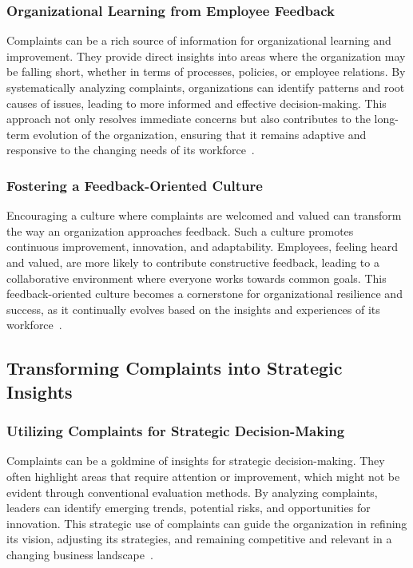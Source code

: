 \documentclass[runningheads]{llncs}
\begin{document}
\subsubsection{Organizational Learning from Employee Feedback}
Complaints can be a rich source of information for organizational learning and improvement. They provide direct insights into areas where the organization may be falling short, whether in terms of processes, policies, or employee relations. By systematically analyzing complaints, organizations can identify patterns and root causes of issues, leading to more informed and effective decision-making. This approach not only resolves immediate concerns but also contributes to the long-term evolution of the organization, ensuring that it remains adaptive and responsive to the changing needs of its workforce~\cite{bear2017performance}.

\subsubsection{Fostering a Feedback-Oriented Culture}
Encouraging a culture where complaints are welcomed and valued can transform the way an organization approaches feedback. Such a culture promotes continuous improvement, innovation, and adaptability. Employees, feeling heard and valued, are more likely to contribute constructive feedback, leading to a collaborative environment where everyone works towards common goals. This feedback-oriented culture becomes a cornerstone for organizational resilience and success, as it continually evolves based on the insights and experiences of its workforce~\cite{london2002feedback}.

\subsection{Transforming Complaints into Strategic Insights}
\subsubsection{Utilizing Complaints for Strategic Decision-Making}
Complaints can be a goldmine of insights for strategic decision-making. They often highlight areas that require attention or improvement, which might not be evident through conventional evaluation methods. By analyzing complaints, leaders can identify emerging trends, potential risks, and opportunities for innovation. This strategic use of complaints can guide the organization in refining its vision, adjusting its strategies, and remaining competitive and relevant in a changing business landscape~\cite{sheng2021value}.
\end{document}
